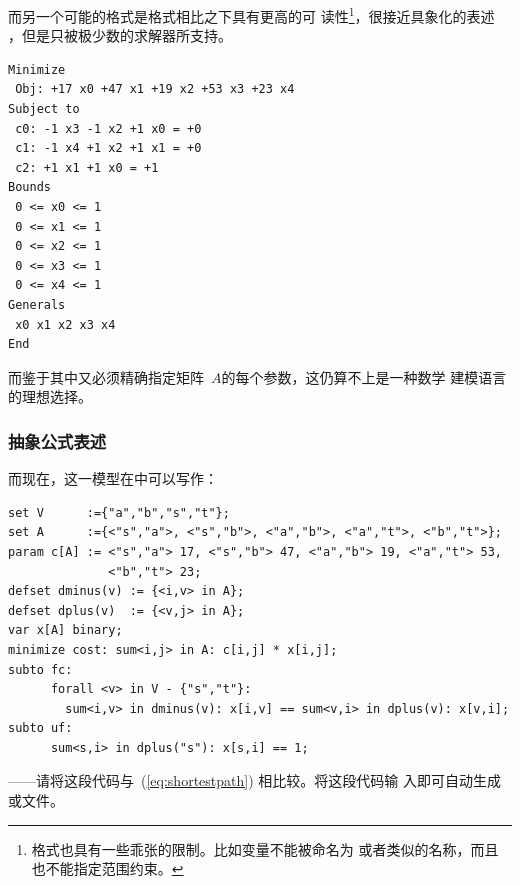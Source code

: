 \bigskip
\noindent 而另一个可能的格式是\lpf 格式\cite{CPlex80}相比之下具有更高的可
读性\footnote{\lpf 格式也具有一些乖张的限制。比如变量不能被命名为
  或者类似的名称，而且也不能指定范围约束。}，很接近具象化的表述
  ，但是只被极少数的求解器所支持。
{ \small
\begin{verbatim}
Minimize
 Obj: +17 x0 +47 x1 +19 x2 +53 x3 +23 x4
Subject to
 c0: -1 x3 -1 x2 +1 x0 = +0
 c1: -1 x4 +1 x2 +1 x1 = +0
 c2: +1 x1 +1 x0 = +1
Bounds
 0 <= x0 <= 1
 0 <= x1 <= 1
 0 <= x2 <= 1
 0 <= x3 <= 1
 0 <= x4 <= 1
Generals
 x0 x1 x2 x3 x4
End
\end{verbatim}
}
\noindent 而鉴于其中又必须精确指定矩阵~$A$的每个参数，这仍算不上是一种数学
建模语言的理想选择。

\subsubsection{抽象公式表述}

而现在，这一模型在\zimpl 中可以写作：

{\small
\begin{verbatim}
set V      :={"a","b","s","t"};
set A      :={<"s","a">, <"s","b">, <"a","b">, <"a","t">, <"b","t">};
param c[A] := <"s","a"> 17, <"s","b"> 47, <"a","b"> 19, <"a","t"> 53,
              <"b","t"> 23;
defset dminus(v) := {<i,v> in A};
defset dplus(v)  := {<v,j> in A};
var x[A] binary;
minimize cost: sum<i,j> in A: c[i,j] * x[i,j];
subto fc:
      forall <v> in V - {"s","t"}:
        sum<i,v> in dminus(v): x[i,v] == sum<v,i> in dplus(v): x[v,i];
subto uf:
      sum<s,i> in dplus("s"): x[s,i] == 1;
\end{verbatim}
}

\noindent ——请将这段代码与~(\ref{eq:shortestpath}) 相比较。将这段代码输
入\zimpl 即可自动生成\mps 或\lpf 文件。


